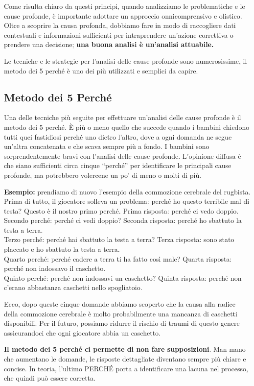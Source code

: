 Come risulta chiaro da questi principi, quando analizziamo le problematiche e le cause profonde, è importante adottare un approccio onnicomprensivo e olistico. Oltre a scoprire la causa profonda, dobbiamo fare in modo di raccogliere dati contestuali e informazioni sufficienti per intraprendere un'azione correttiva o prendere una decisione; \textbf{una buona analisi è un'analisi attuabile.}

Le tecniche e le strategie per l'analisi delle cause profonde sono numerosissime, il metodo dei 5 perché è uno dei più utilizzati e semplici da capire.

\subsection{Metodo dei 5 Perché}
Una delle tecniche più seguite per effettuare un'analisi delle cause profonde è il metodo dei 5 perché. È più o meno quello che succede quando i bambini chiedono tutti quei fastidiosi perché uno dietro l'altro, dove a ogni domanda ne segue un'altra concatenata e che scava sempre più a fondo. I bambini sono sorprendentemente bravi con l'analisi delle cause profonde. L'opinione diffusa è che siano sufficienti circa cinque ``perché'' per identificare le principali cause profonde, ma potrebbero volercene un po' di meno o molti di più.

\textbf{Esempio:} prendiamo di nuovo l'esempio della commozione cerebrale del rugbista. \\

Prima di tutto, il giocatore solleva un problema: perché ho questo terribile mal di testa? Questo è il nostro primo perché.
Prima risposta: perché ci vedo doppio.\\
Secondo perché: perché ci vedi doppio?
Seconda risposta: perché ho sbattuto la testa a terra.\\
Terzo perché: perché hai sbattuto la testa a terra?
Terza risposta: sono stato placcato e ho sbattuto la testa a terra.\\
Quarto perché: perché cadere a terra ti ha fatto così male?
Quarta risposta: perché non indossavo il caschetto.\\
Quinto perché: perché non indossavi un caschetto?
Quinta risposta: perché non c'erano abbastanza caschetti nello spogliatoio.

Ecco, dopo queste cinque domande abbiamo scoperto che la causa alla radice della commozione cerebrale è molto probabilmente una mancanza di caschetti disponibili. Per il futuro, possiamo ridurre il rischio di traumi di questo genere assicurandoci che ogni giocatore abbia un caschetto.

\textbf{Il metodo dei 5 perché ci permette di non fare supposizioni}. Man mano che aumentano le domande, le risposte dettagliate diventano sempre più chiare e concise. In teoria, l'ultimo PERCHÉ porta a identificare una lacuna nel processo, che quindi può essere corretta.
